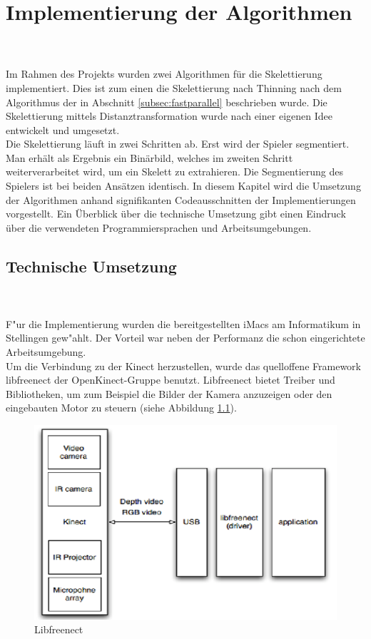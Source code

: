 \chapter{Implementierung der Algorithmen}
\label{ch:implementierung}
\\\\
Im Rahmen des Projekts wurden zwei Algorithmen für die Skelettierung implementiert. Dies ist zum einen
die Skelettierung nach Thinning nach dem Algorithmus der in Abschnitt \ref{subsec:fastparallel} beschrieben wurde. Die Skelettierung mittels Distanztransformation wurde nach einer eigenen Idee entwickelt und
umgesetzt.\\
Die Skelettierung läuft in zwei Schritten ab. Erst wird der Spieler segmentiert. Man erhält als
Ergebnis ein Binärbild, welches im zweiten Schritt weiterverarbeitet wird, um ein Skelett zu extrahieren. 
Die Segmentierung des Spielers ist bei beiden Ansätzen identisch.
In diesem Kapitel wird die Umsetzung der Algorithmen anhand signifikanten Codeausschnitten der Implementierungen vorgestellt. Ein Überblick über die technische Umsetzung gibt einen Eindruck über die
verwendeten Programmiersprachen und Arbeitsumgebungen.
\section{Technische Umsetzung}
\label{sec:technische_umsetzung}
\\\\
F"ur die Implementierung wurden die bereitgestellten iMacs am Informatikum in Stellingen gew"ahlt. Der Vorteil war neben der Performanz die schon eingerichtete Arbeitsumgebung.\\
Um die Verbindung zu der Kinect herzustellen, wurde das quelloffene Framework libfreenect  der OpenKinect-Gruppe benutzt. Libfreenect bietet Treiber und Bibliotheken, um zum Beispiel die Bilder der Kamera anzuzeigen oder den eingebauten Motor zu steuern (siehe Abbildung \ref{fig:libfreenect}). \\
\begin{figure}
\centering
\includegraphics[width=0.7\linewidth]{./fig/libfreenect}
\caption{Libfreenect  \cite{libfreenect}}
\label{fig:libfreenect}
\end{figure}

